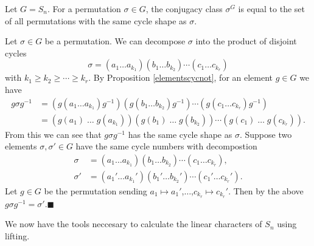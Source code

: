 \documentclass[../Project.tex]{subfiles}
\begin{document}
\begin{theo}[{\cite[Theorem 12.15]{2}}]
	Let $G = S_n$. For a permutation $\sigma \in G$, the conjugacy class $\sigma^{G}$ is equal to the set of all permutations with the same cycle shape as $\sigma$.
	\label{theo12.15}
\end{theo}
\begin{proo*}[{\cite[Proposition 12.13]{2}}]
	Let $\sigma \in G$ be a permutation. We can decompose $\sigma$ into the product of disjoint cycles
	$$\sigma = (a_1\dots a_{k_1})(b_1\dots b_{k_2})\cdots(c_1\dots c_{k_r})$$
	with $k_1 \geqslant k_2 \geqslant \cdots \geqslant k_r$. By Proposition \ref{elementscycnot}, for an element $g \in G$ we have
	\begin{align*}
	g\sigma g^{-1} &= (g(a_1\dots a_{k_1})g^{-1})(g(b_1\dots b_{k_2})g^{-1})\cdots (g(c_1\dots c_{k_r})g^{-1})\\
	&= (g(a_1)\;\dots\; g(a_{k_1}))(g(b_1)\;\dots\; g(b_{k_2}))\cdots(g(c_1)\;\dots\; g(c_{k_r})).
	\end{align*}
	From this we can see that $g\sigma g^{-1}$ has the same cycle shape as $\sigma$.
	Suppose two elements $\sigma, \sigma' \in G$ have the same cycle numbers with decompostion
	\begin{align*}
		\sigma &= (a_1\dots a_{k_1})(b_1\dots b_{k_2})\cdots(c_1\dots c_{k_r}),\\
		\sigma' &= (a_1'\dots a_{k_1}')(b_1'\dots b_{k_2}')\cdots(c_1'\dots c_{k_r}').
	\end{align*}
	Let $g \in G$ be the permutation sending $a_1 \mapsto a_1'$,$\dots$,$c_{k_r} \mapsto c_{k_r}'$. Then by the above $g\sigma g^{-1} = \sigma'$.\hfill$\blacksquare$\\
\end{proo*}

We now have the tools neccesary to calculate the linear characters of $S_n$ using lifting.
\end{document}
